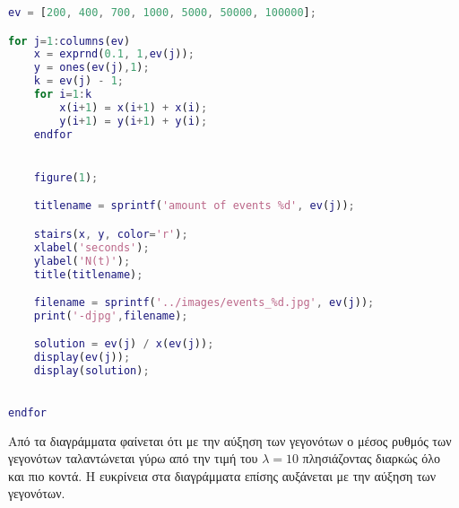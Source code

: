 \documentclass[12pt]{article}
\begin{document}
\begin{lstlisting}[language=Matlab]
ev = [200, 400, 700, 1000, 5000, 50000, 100000];

for j=1:columns(ev)
	x = exprnd(0.1, 1,ev(j));
	y = ones(ev(j),1);
	k = ev(j) - 1;
	for i=1:k
		x(i+1) = x(i+1) + x(i);
		y(i+1) = y(i+1) + y(i);
	endfor


	figure(1); 

	titlename = sprintf('amount of events %d', ev(j));

	stairs(x, y, color='r');
	xlabel('seconds');
	ylabel('N(t)');
	title(titlename);

	filename = sprintf('../images/events_%d.jpg', ev(j));
	print('-djpg',filename);

	solution = ev(j) / x(ev(j)); 
	display(ev(j));
	display(solution);

	
endfor

\end{lstlisting}

Από τα διαγράμματα φαίνεται ότι με την αύξηση των γεγονότων ο μέσος ρυθμός των γεγονότων
ταλαντώνεται γύρω από την τιμή του $\lambda = 10$ πλησιάζοντας διαρκώς όλο και πιο κοντά.
Η ευκρίνεια στα διαγράμματα επίσης αυξάνεται με την αύξηση των γεγονότων.
\end{document}
